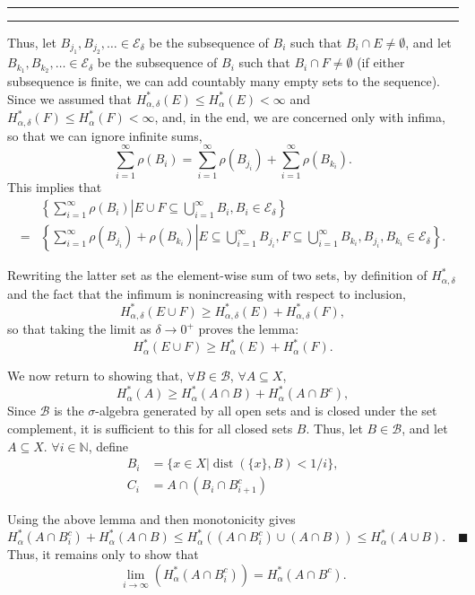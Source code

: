 \documentclass[11pt]{article}
\newcounter{questionCounter}
\newcounter{partCounter}[questionCounter]
\newenvironment{question}[2][\arabic{questionCounter}]{%
    \setcounter{partCounter}{0}%
    \vspace{.25in} \hrule \vspace{0.5em}%
        \noindent{\bf #2}%
    \vspace{0.8em} \hrule \vspace{.10in}%
    \addtocounter{questionCounter}{1}%
}{}
\newcommand{\mqed}{\quad \blacksquare}
\newcommand{\dist}{\operatorname{dist}}
\begin{document}
\begin{question}{Problem 4}
\begin{enumerate}[(a)]
Thus, let $B_{j_1},B_{j_2},\ldots \in \mathcal{E}_{\delta}$ be the subsequence
of $B_i$ such that $B_i \cap E \neq \emptyset$, and let
$B_{k_1},B_{k_2},\ldots \in \mathcal{E}_{\delta}$ be the subsequence of $B_i$
such that $B_i \cap F \neq \emptyset$ (if either subsequence is finite, we can
add countably many empty sets to the sequence).
Since we assumed that $H^*_{\alpha,\delta}(E) \leq H^*_{\alpha}(E) < \infty$
and $H^*_{\alpha,\delta}(F) \leq H^*_{\alpha}(F) < \infty$, and, in the end,
we are concerned only with infima, so that we can ignore infinite sums,
\[\sum_{i = 1}^{\infty} \rho(B_i)
 = \sum_{i = 1}^{\infty} \rho(B_{j_i})
 + \sum_{i = 1}^{\infty} \rho(B_{k_i}).
\]
This implies that
\begin{align*}
   & \left\{\sum_{i = 1}^{\infty} \rho(B_i) \right|
            \left. E \cup F \subseteq \bigcup_{i = 1}^{\infty} B_i,
                        B_i \in \mathcal{E}_{\delta}\right\} \\
 = & \left\{\sum_{i = 1}^{\infty} \rho(B_{j_i}) + \rho(B_{k_i})\right|
            \left. E \subseteq \bigcup_{i = 1}^{\infty} B_{j_i},
                   F \subseteq \bigcup_{i = 1}^{\infty} B_{k_i},
                        B_{j_i},B_{k_i} \in \mathcal{E}_{\delta}\right\}.
\end{align*}

Rewriting the latter set as the element-wise sum of two sets, by definition of
$H^*_{\alpha,\delta}$ and the fact that the infimum is nonincreasing with
respect to inclusion,
\[H^*_{\alpha,\delta}(E \cup F)
 \geq H^*_{\alpha,\delta}(E)
 +    H^*_{\alpha,\delta}(F),\]
so that taking the limit as $\delta \rightarrow 0^+$ proves the lemma:
\[H^*_{\alpha}(E \cup F) \geq H^*_{\alpha}(E) + H^*_{\alpha}(F).\]

We now return to showing that, $\forall B \in \mathcal{B}$,
$\forall A \subseteq X$,
\[H^*_{\alpha}(A) \geq H^*_{\alpha}(A \cap B) + H^*_{\alpha}(A \cap B^c),\]
Since $\mathcal{B}$ is the $\sigma$-algebra generated by all open sets and is
closed under the set complement, it is sufficient to this for all closed sets
$B$. Thus, let $B \in \mathcal{B}$, and let $A \subseteq X$.
$\forall i \in \mathbb{N}$, define
\begin{align*}
B_i & = \{x \in X | \dist(\{x\},B) < 1/i\}, \\
C_i & = A \cap (B_i \cap B_{i + 1}^c)
\end{align*}

Using the above lemma and then monotonicity gives
\[H^*_{\alpha}(A \cap B_i^c) + H^*_{\alpha}(A \cap B)
 \leq H^*_{\alpha}((A \cap B_i^c) \cup (A \cap B))
 \leq H^*_{\alpha}(A \cup B). \mqed
\]
Thus, it remains only to show that
\[\lim_{i \rightarrow \infty} \left(H^*_{\alpha}(A \cap B_i^c)\right)
 = H^*_{\alpha}(A \cap B^c).\]


\end{enumerate}
\end{question}
\end{document}
